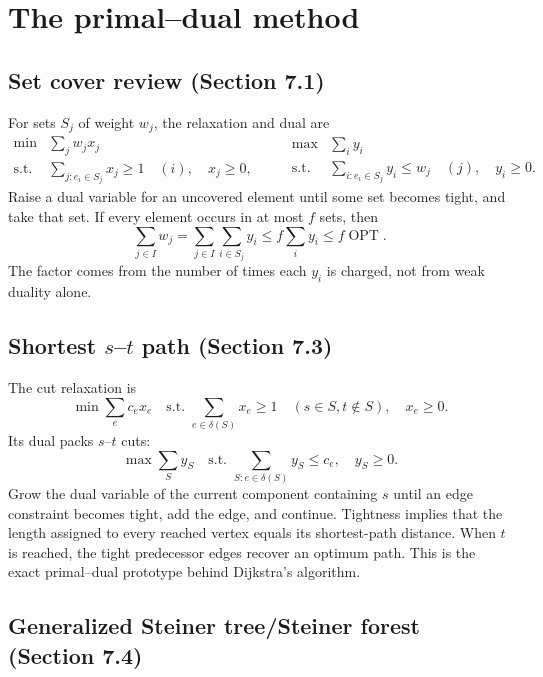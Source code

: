 \documentclass[11pt,a4paper]{article}
\newcommand{\OPT}{\operatorname{OPT}}
\newcommand{\1}{\mathbf 1}
\begin{document}
\section{The primal--dual method}

\subsection{Set cover review (Section 7.1)}

For sets $S_j$ of weight $w_j$, the relaxation and dual are
\[
 \begin{array}{ll}
 \min & \sum_jw_jx_j\\
 \text{s.t.}&\sum_{j:e_i\in S_j}x_j\geq1\quad(i),\quad x_j\geq0,
 \end{array}
 \qquad
 \begin{array}{ll}
 \max & \sum_i y_i\\
 \text{s.t.}&\sum_{i:e_i\in S_j}y_i\leq w_j\quad(j),\quad y_i\geq0.
 \end{array}
\]
Raise a dual variable for an uncovered element until some set becomes tight, and take
that set.  If every element occurs in at most $f$ sets, then
\[
 \sum_{j\in I}w_j
 =\sum_{j\in I}\sum_{i\in S_j}y_i
 \leq f\sum_i y_i
 \leq f\OPT.
\]
The factor comes from the number of times each $y_i$ is charged, not from weak duality
alone.

\subsection{Shortest $s$--$t$ path (Section 7.3)}

The cut relaxation is
\[
 \min\sum_ec_ex_e
 \quad\text{s.t. }\sum_{e\in\delta(S)}x_e\geq1
 \quad(s\in S,t\notin S),\quad x_e\geq0.
\]
Its dual packs $s$--$t$ cuts:
\[
 \max\sum_Sy_S
 \quad\text{s.t. }\sum_{S:e\in\delta(S)}y_S\leq c_e,\quad y_S\geq0.
\]
Grow the dual variable of the current component containing $s$ until an edge constraint
becomes tight, add the edge, and continue.  Tightness implies that the length assigned
to every reached vertex equals its shortest-path distance.  When $t$ is reached, the
tight predecessor edges recover an optimum path.  This is the exact primal--dual
prototype behind Dijkstra's algorithm.

\subsection{Generalized Steiner tree/Steiner forest (Section 7.4)}
\end{document}
